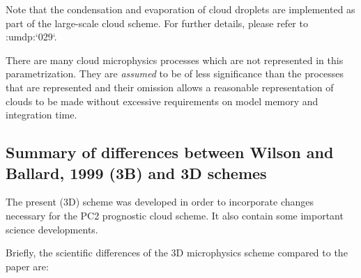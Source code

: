 \documentclass{UMDP_article}
\newcommand{\citeumdp}[1]{:umdp:`#1`}
\begin{document}
Note that the condensation and evaporation of cloud droplets are implemented as part of the 
large-scale cloud scheme. For further details, please refer to \citeumdp{029}. 

There are many cloud microphysics processes which 
are not represented in this parametrization. They are \textit{assumed} to be of 
less significance than the processes that are represented and their omission 
allows a reasonable representation of clouds to be made without excessive 
requirements on model memory and integration time.

\subsection{Summary of differences between Wilson and Ballard, 1999 (3B) and 3D schemes}

The present (3D) scheme was developed in order to incorporate changes 
necessary for the PC2 prognostic cloud scheme. It also contain some important 
science developments.

Briefly, the scientific differences of the 3D microphysics scheme compared 
to the \cite{Wilson:Ballard:1999} paper are:
\end{document}
